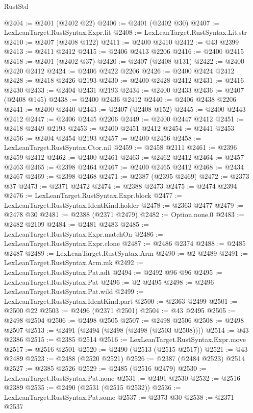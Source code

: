 \begin{lexlean}{RustStd}
\begin{coremodule}
@2404 := @2401 (@2402 @22)
@2406 := @2401 (@2402 @30)
@2407 := LexLeanTarget.RustSyntax.Expr.lit
@2408 := LexLeanTarget.RustSyntax.Lit.str
@2410 := @2407 (@2408 @122)
@2411 := @2400 @2410
@2412 := @43 @2399
@2413 := @2411 @2412
@2415 := @2406 @2413 @2206
@2416 := @2400 @2415
@2418 := @2401 (@2402 @37)
@2420 := @2407 (@2408 @131)
@2422 := @2400 @2420 @2412
@2424 := @2406 @2422 @2206
@2426 := @2400 @2424 @2412
@2428 := @2418 @2426 @2193
@2430 := @2400 @2428 @2412
@2431 := @2416 @2430
@2433 := @2404 @2431 @2193
@2434 := @2400 @2433
@2436 := @2407 (@2408 @145)
@2438 := @2400 @2436 @2412
@2440 := @2406 @2438 @2206
@2441 := @2400 @2440
@2443 := @2407 (@2408 @152)
@2445 := @2400 @2443 @2412
@2447 := @2406 @2445 @2206
@2449 := @2400 @2447 @2412
@2451 := @2418 @2449 @2193
@2453 := @2400 @2451 @2412
@2454 := @2441 @2453
@2456 := @2404 @2454 @2193
@2457 := @2400 @2456
@2458 := LexLeanTarget.RustSyntax.Ctor.nil
@2459 := @2458 @2111
@2461 := @2396 @2459 @2412
@2462 := @2400 @2461
@2463 := @2462 @2412
@2464 := @2457 @2463
@2465 := @2398 @2464
@2467 := @2400 @2465 @2412
@2468 := @2434 @2467
@2469 := @2398 @2468
@2471 := @2387 (@2395 @2469)
@2472 := @2373 @37
@2473 := @2371 @2472
@2474 := @2388 @2473
@2475 := @2474 @2394
@2476 := LexLeanTarget.RustSyntax.Expr.block
@2477 := LexLeanTarget.RustSyntax.IdentKind.holder
@2478 := @2363 @2477
@2479 := @2478 @30
@2481 := @2388 (@2371 @2479)
@2482 := Option.none.{0}
@2483 := @2482 @2109
@2484 := @2481 @2483
@2485 := LexLeanTarget.RustSyntax.Expr.matchOn
@2486 := LexLeanTarget.RustSyntax.Expr.clone
@2487 := @2486 @2374
@2488 := @2485 @2487
@2489 := LexLeanTarget.RustSyntax.Arm
@2490 := @2 @2489
@2491 := LexLeanTarget.RustSyntax.Arm.mk
@2492 := LexLeanTarget.RustSyntax.Pat.adt
@2494 := @2492 @96 @96
@2495 := LexLeanTarget.RustSyntax.Pat
@2496 := @2 @2495
@2498 := @2496 LexLeanTarget.RustSyntax.Pat.wild
@2499 := LexLeanTarget.RustSyntax.IdentKind.part
@2500 := @2363 @2499
@2501 := @2500 @22
@2503 := @2496 (@2371 @2501)
@2504 := @43 @2495
@2505 := @2498 @2504
@2506 := @2498 @2505
@2507 := @2498 @2506
@2508 := @2498 @2507
@2513 := @2491 (@2494 (@2498 (@2498 (@2503 @2508))))
@2514 := @43 @2386
@2515 := @2385 @2514
@2516 := LexLeanTarget.RustSyntax.Expr.move
@2517 := @2516 @2501
@2520 := @2490 (@2513 (@2515 @2517))
@2521 := @43 @2489
@2523 := @2488 (@2520 @2521)
@2526 := @2387 (@2484 @2523) @2514
@2527 := @2385 @2526
@2529 := @2485 (@2516 @2479)
@2530 := LexLeanTarget.RustSyntax.Pat.none
@2531 := @2491 @2530
@2532 := @2516 @2389
@2535 := @2490 (@2531 (@2515 @2532))
@2536 := LexLeanTarget.RustSyntax.Pat.some
@2537 := @2373 @30
@2538 := @2371 @2537

\end{coremodule}
\end{lexlean}

